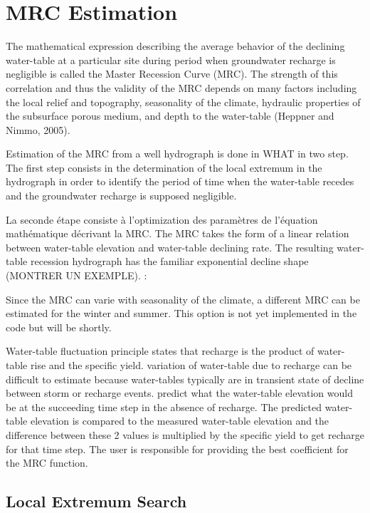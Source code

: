 \documentclass[WHATMANUAL.tex]{subfiles}
\begin{document}
\chapter{MRC Estimation}

The mathematical expression describing the average behavior of the declining water-table at a particular site during period when groundwater recharge is negligible is called the Master Recession Curve (MRC). The strength of this correlation and thus the validity of the MRC depends on many factors including the local relief and topography, seasonality of the climate, hydraulic properties of the subsurface porous medium, and depth to the water-table (Heppner and Nimmo, 2005). 

Estimation of the MRC from a well hydrograph is done in WHAT in two step. The first step consists in the determination of the local extremum in the hydrograph in order to identify the period of time when the water-table recedes and the groundwater recharge is supposed negligible. 

La seconde étape consiste à l'optimization des paramètres de l'équation mathématique décrivant la MRC. The MRC takes the form of a linear relation between water-table elevation and water-table declining rate. The resulting water-table recession hydrograph has the familiar exponential decline shape (MONTRER UN EXEMPLE). :

Since the MRC can varie with seasonality of the climate, a different MRC can be estimated for the winter and summer. This option is not yet implemented in the code but will be shortly.

Water-table fluctuation principle states that recharge is the product of water-table rise and the specific yield. variation of water-table due to recharge can be difficult to estimate because water-tables typically are in transient state of decline between storm or recharge events. predict what the water-table elevation would be at the succeeding time step in the absence of recharge. The predicted water-table elevation is compared to the measured water-table elevation and the difference between these 2 values is multiplied by the specific yield to get recharge for that time step. The user is responsible for providing the best coefficient for the MRC function.

\section{Local Extremum Search}
\end{document}
